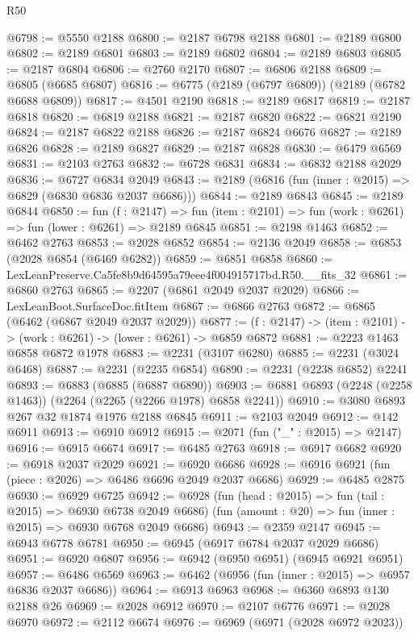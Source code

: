 \begin{lexlean}{R50}
\begin{coremodule}
@6798 := @5550 @2188
@6800 := @2187 @6798 @2188
@6801 := @2189 @6800
@6802 := @2189 @6801
@6803 := @2189 @6802
@6804 := @2189 @6803
@6805 := @2187 @6804
@6806 := @2760 @2170
@6807 := @6806 @2188
@6809 := @6805 (@6685 @6807)
@6816 := @6775 (@2189 (@6797 @6809)) (@2189 (@6782 @6688 @6809))
@6817 := @4501 @2190
@6818 := @2189 @6817
@6819 := @2187 @6818
@6820 := @6819 @2188
@6821 := @2187 @6820
@6822 := @6821 @2190
@6824 := @2187 @6822 @2188
@6826 := @2187 @6824 @6676
@6827 := @2189 @6826
@6828 := @2189 @6827
@6829 := @2187 @6828
@6830 := @6479 @6569
@6831 := @2103 @2763
@6832 := @6728 @6831
@6834 := @6832 @2188 @2029
@6836 := @6727 @6834 @2049
@6843 := @2189 (@6816 (fun (inner : @2015) => @6829 (@6830 @6836 @2037 @6686)))
@6844 := @2189 @6843
@6845 := @2189 @6844
@6850 := fun (f : @2147) =>
  fun (item : @2101) => fun (work : @6261) => fun (lower : @6261) => @2189 @6845
@6851 := @2198 @1463
@6852 := @6462 @2763
@6853 := @2028 @6852
@6854 := @2136 @2049
@6858 := @6853 (@2028 @6854 (@6469 @6282))
@6859 := @6851 @6858
@6860 := LexLeanPreserve.Ca5fe8b9d64595a79eee4f004915717bd.R50.__fits_32
@6861 := @6860 @2763
@6865 := @2207 (@6861 @2049 @2037 @2029)
@6866 := LexLeanBoot.SurfaceDoc.fitItem
@6867 := @6866 @2763
@6872 := @6865 (@6462 (@6867 @2049 @2037 @2029))
@6877 := (f : @2147) -> (item : @2101) -> (work : @6261) -> (lower : @6261) -> @6859 @6872
@6881 := @2223 @1463 @6858 @6872 @1978
@6883 := @2231 (@3107 @6280)
@6885 := @2231 (@3024 @6468)
@6887 := @2231 (@2235 @6854)
@6890 := @2231 (@2238 @6852) @2241
@6893 := @6883 (@6885 (@6887 @6890))
@6903 := @6881 @6893 (@2248 (@2258 @1463)) (@2264 (@2265 (@2266 @1978) @6858 @2241))
@6910 := @3080 @6893 @267 @32 @1874 @1976 @2188 @6845
@6911 := @2103 @2049
@6912 := @142 @6911
@6913 := @6910 @6912
@6915 := @2071 (fun ("_" : @2015) => @2147)
@6916 := @6915 @6674
@6917 := @6485 @2763
@6918 := @6917 @6682
@6920 := @6918 @2037 @2029
@6921 := @6920 @6686
@6928 := @6916 @6921 (fun (piece : @2026) => @6486 @6696 @2049 @2037 @6686)
@6929 := @6485 @2875
@6930 := @6929 @6725
@6942 := @6928
    (fun (head : @2015) => fun (tail : @2015) => @6930 @6738 @2049 @6686)
    (fun (amount : @20) => fun (inner : @2015) => @6930 @6768 @2049 @6686)
@6943 := @2359 @2147
@6945 := @6943 @6778 @6781
@6950 := @6945 (@6917 @6784 @2037 @2029 @6686)
@6951 := @6920 @6807
@6956 := @6942 (@6950 @6951) (@6945 @6921 @6951)
@6957 := @6486 @6569
@6963 := @6462 (@6956 (fun (inner : @2015) => @6957 @6836 @2037 @6686))
@6964 := @6913 @6963
@6968 := @6360 @6893 @130 @2188 @26
@6969 := @2028 @6912
@6970 := @2107 @6776
@6971 := @2028 @6970
@6972 := @2112 @6674
@6976 := @6969 (@6971 (@2028 @6972 @2023))

\end{coremodule}
\end{lexlean}
